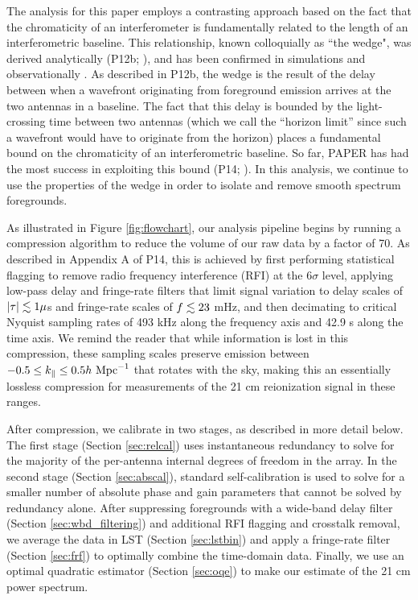 \documentclass[twocolumn,numberedappendix]{emulateapj} \shorttitle{New Limits on the 21 cm Power Spectrum at $z=8.4$}
\newcommand{\hMpci}{h\ {\rm Mpc}^{-1}}
\begin{document}
The analysis for this paper employs a contrasting
approach based on the fact that the chromaticity of an interferometer
is fundamentally related to the length of an interferometric baseline.  This relationship, known
colloquially as ``the wedge", was 
derived analytically (P12b; \citealt{vedantham_et_al2012,liu_et_al2014a,liu_et_al2014b}), and has been confirmed in 
simulations \citep{datta_et_al2010,hazelton_et_al2013} and observationally
\citep{pober_et_al2013,dillon_et_al2013b}.  As described in P12b, the wedge is the result of the delay
between when a wavefront originating from foreground emission
arrives at the two antennas in a baseline.  The fact that this delay is bounded by the light-crossing
time between two antennas (which we call the ``horizon limit'' since such a wavefront would have to 
originate from the horizon) places a fundamental bound on the chromaticity of
an interferometric baseline.  So far, PAPER has had the most success in exploiting this bound
(P14; \citealt{jacobs_et_al2014}). 
In this analysis, we continue to use the properties of the 
wedge in order to isolate and remove smooth
spectrum foregrounds.

As illustrated in Figure \ref{fig:flowchart},
our analysis pipeline begins by running a compression
algorithm to reduce the volume of our raw data by a factor of 70.
As described in Appendix A of P14, this is achieved by first performing statistical flagging to remove
radio frequency interference (RFI) at the 6$\sigma$ level, applying low-pass delay and fringe-rate filters that limit signal variation
to delay scales of $|\tau|\lesssim1 \mu$s and fringe-rate scales of $f\lesssim23$ mHz, and then 
decimating to critical Nyquist sampling rates of 493 kHz along the frequency axis
and 42.9 s along the time axis.  We remind the reader that while information is lost in this compression,
these sampling scales preserve emission between
$-0.5\le k_\parallel\le 0.5\hMpci$ that rotates with the sky, making this an essentially lossless compression 
for measurements of the 21 cm reionization signal in these ranges.

After compression, we calibrate in two stages, as described in more detail below.  
The first stage (Section \ref{sec:relcal}) uses instantaneous redundancy to solve for the majority of the 
per-antenna internal degrees of freedom in the array.  In the second stage (Section \ref{sec:abscal}), standard self-calibration is used 
to solve for a smaller number of
absolute phase and gain parameters that cannot be solved by redundancy alone. 
After suppressing foregrounds with a
wide-band delay filter (Section \ref{sec:wbd_filtering}) and additional RFI flagging and crosstalk removal, 
we average the data in LST (Section \ref{sec:lstbin}) and apply a
fringe-rate filter (Section \ref{sec:frf}) to optimally combine the time-domain data. 
Finally, we use an
optimal quadratic estimator (Section \ref{sec:oqe}) to make our estimate of the 21 cm power spectrum.
\end{document}
